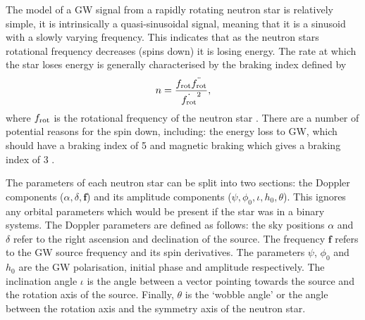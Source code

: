 The model of a \gls{GW} signal from a rapidly rotating neutron star is relatively simple, it is intrinsically a
quasi-sinusoidal signal, meaning that it is a sinusoid with a slowly
varying frequency. This indicates that as the neutron stars rotational frequency decreases (spins down) it is losing energy. The rate at which the star loses energy is generally characterised by the braking index defined by
\begin{equation}
	n = \frac{f_{\rm{rot}} \ddot{f_{\rm{rot}}}}{\dot{f_{\rm{rot}}}^2},
\end{equation}
where $f_{\rm{rot}}$ is the rotational frequency of the neutron star \citep{dearaujo2016GravitationalWaves}.
There are a number of potential reasons for the spin down, including: the energy loss to \gls{GW}, which should have a braking index of 5 \citep{dearaujo2016GravitationalWaves} and magnetic braking which gives a braking index of 3 \citep{dearaujo2016GravitationalWaves}.

The parameters of each neutron star can be split into two sections: the Doppler components
($\alpha,\delta,{\bm f}$) and its amplitude components ($\psi,\phi_0, \iota,
h_0, \theta$). This ignores any orbital parameters which would be present if the
star was in a binary systems. The Doppler parameters are defined as follows: the sky positions
$\alpha$ and $\delta$ refer to the right ascension and declination of the source. The frequency ${\bm f}$ refers to
the \gls{GW} source frequency and its spin derivatives.  The parameters $\psi$,
$\phi_0$ and $h_0 $ are the \gls{GW} polarisation, initial phase and amplitude
respectively.  The inclination angle $\iota$ is the angle between a vector pointing towards the source and the rotation axis of the source. 
Finally, $\theta$ is the `wobble angle' or the angle between the rotation axis and the
symmetry axis of the neutron star.

